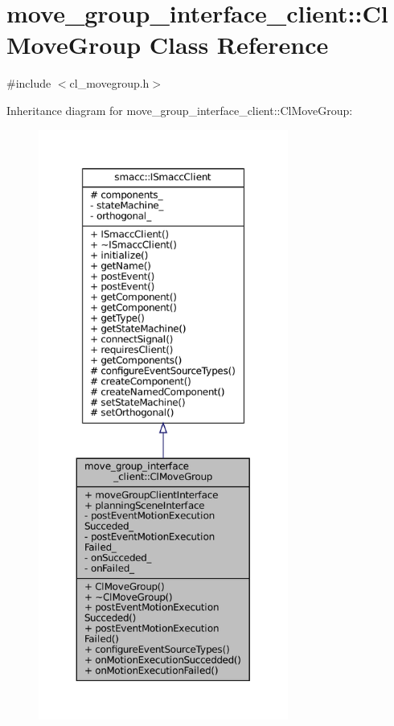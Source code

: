 \hypertarget{classmove__group__interface__client_1_1ClMoveGroup}{}\section{move\+\_\+group\+\_\+interface\+\_\+client\+:\+:Cl\+Move\+Group Class Reference}
\label{classmove__group__interface__client_1_1ClMoveGroup}


{\ttfamily \#include $<$cl\+\_\+movegroup.\+h$>$}



Inheritance diagram for move\+\_\+group\+\_\+interface\+\_\+client\+:\+:Cl\+Move\+Group\+:
\nopagebreak
\begin{figure}[H]
\begin{center}
\leavevmode
\includegraphics[height=550pt]{classmove__group__interface__client_1_1ClMoveGroup__inherit__graph}
\end{center}
\end{figure}


